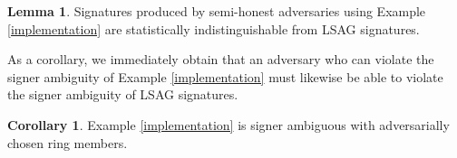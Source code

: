 \documentclass{mrl}
\theoremstyle{definition}
\numberwithin{theorem}{subsection}
\newtheorem{lemma}[theorem]{Lemma}
\newtheorem{cor}[theorem]{Corollary}
\newtheorem{defn}[theorem]{Definition}
\newcommand{\adversary}{\mathcal{A}}
\begin{document}
\begin{lemma}
Signatures produced by semi-honest adversaries using Example \ref{implementation} are statistically indistinguishable from LSAG signatures.
\end{lemma}
As a corollary, we immediately obtain that an adversary who can violate the signer ambiguity of Example \ref{implementation} must likewise be able to violate the signer ambiguity of LSAG signatures.
\begin{cor}
Example \ref{implementation} is signer ambiguous with adversarially chosen ring members.
\end{cor}



\end{document}
